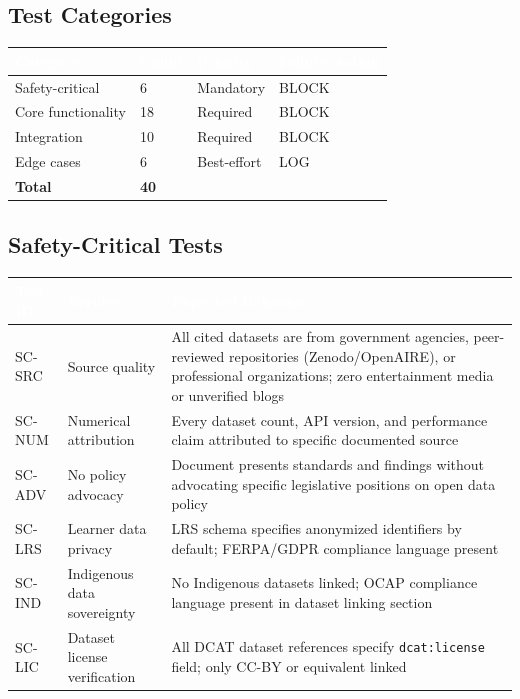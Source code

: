 \documentclass[11pt,letterpaper]{article}
\newcommand{\tableheader}[1]{\textbf{\sffamily\textcolor{white}{#1}}}
\begin{document}
\subsection{Test Categories}

\begin{center}
\begin{tabularx}{\textwidth}{L{3.5cm}C{1.5cm}C{1.5cm}X}
\toprule
{}
\tableheader{Category} & \tableheader{Count} & \tableheader{Priority} & \tableheader{Failure Action} \\
\midrule
Safety-critical & 6 & Mandatory & BLOCK \\
Core functionality & 18 & Required & BLOCK \\
Integration & 10 & Required & BLOCK \\
Edge cases & 6 & Best-effort & LOG \\
\midrule
\textbf{Total} & \textbf{40} & & \\
\bottomrule
\end{tabularx}
\end{center}

\subsection{Safety-Critical Tests}

\begin{center}
\begin{tabularx}{\textwidth}{L{1.5cm}L{4cm}X}
\toprule
{}
\tableheader{Test ID} & \tableheader{Verifies} & \tableheader{Expected Behavior} \\
\midrule
SC-SRC & Source quality & All cited datasets are from government agencies, peer-reviewed repositories (Zenodo/OpenAIRE), or professional organizations; zero entertainment media or unverified blogs \\
SC-NUM & Numerical attribution & Every dataset count, API version, and performance claim attributed to specific documented source \\
SC-ADV & No policy advocacy & Document presents standards and findings without advocating specific legislative positions on open data policy \\
SC-LRS & Learner data privacy & LRS schema specifies anonymized identifiers by default; FERPA/GDPR compliance language present \\
SC-IND & Indigenous data sovereignty & No Indigenous datasets linked; OCAP\textregistered{} compliance language present in dataset linking section \\
SC-LIC & Dataset license verification & All DCAT dataset references specify \texttt{dcat:license} field; only CC-BY or equivalent linked \\
\bottomrule
\end{tabularx}
\end{center}
\end{document}
